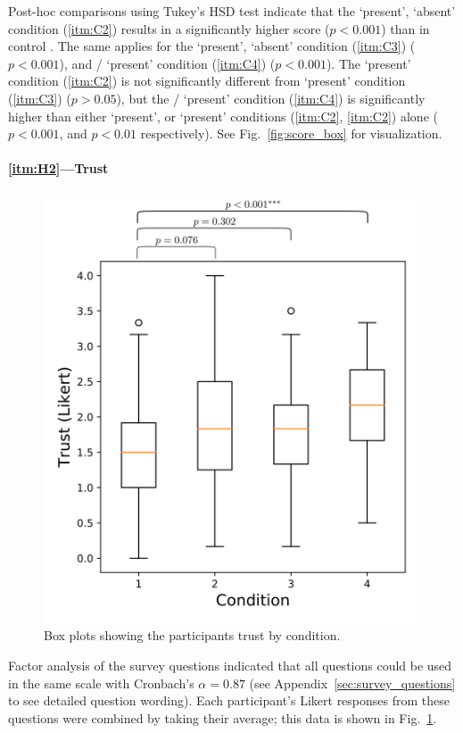 Post-hoc comparisons using Tukey's HSD test indicate that the \xQ{} `present', \xO{} `absent' condition (\ref{itm:C2})  results in a significantly higher score ($p<0.001$) than in control . The same applies for the \xO{} `present', \xQ{} `absent' condition (\ref{itm:C3})  ($p<0.001$), and \xQ/\xO{} `present' condition (\ref{itm:C4})  ($p<0.001$). The \xQ{} `present' condition (\ref{itm:C2}) is not significantly different from \xO{} `present' condition (\ref{itm:C3}) ($p>0.05$), but the \xQ/\xO{} `present' condition (\ref{itm:C4}) is significantly higher than either \xQ{} `present', or \xO{} `present' conditions (\ref{itm:C2}, \ref{itm:C2}) alone ($p<0.001$, and $p<0.01$ respectively). See Fig.~\ref{fig:score_box} for visualization.

\paragraph{\ref{itm:H2}---Trust}
       \begin{figure}[tb]
            \centering
            \includegraphics[width=0.8\linewidth]{Figures/trust_box.png}
            \caption{Box plots showing the participants trust by condition.}
            \label{fig:trust_box}
       \end{figure}
Factor analysis of the survey questions indicated that all questions could be used in the same scale with Cronbach's $\alpha = 0.87$ (see Appendix~\ref{sec:survey_questions} to see detailed question wording). Each participant's Likert responses from these questions were combined by taking their average; this data is shown in Fig.~\ref{fig:trust_box}.

